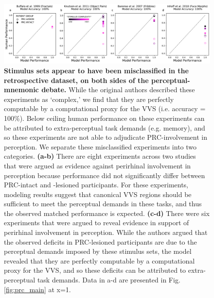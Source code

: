 \documentclass[11pt]{article}
\begin{document}
\begin{figure}[ht]
\centering
\renewcommand{\figurename}{Supplementary Figure}
\includegraphics[width=\linewidth]{figures/S2}
\caption{\textbf{Stimulus sets appear to have been misclassified in the retrospective dataset, on both sides of the perceptual-mnemonic debate.} While the original authors described these experiments as `complex,' we find that they are perfectly computable by a computational proxy for the VVS (i.e. accuracy = 100\%). Below ceiling human performance on these experiments can be attributed to extra-perceptual task demands (e.g. memory), and so these experiments are not able to adjudicate PRC-involvement in perception. We separate these misclassified experiments into two categories. \textbf{(a-b)} There are eight experiments across two studies that were argued as evidence against perirhinal involvement in perception because performance did not significantly differ between PRC-intact and -lesioned participants. For these experiments, modeling results suggest that canonical VVS regions should be sufficient to meet the perceptual demands in these tasks, and thus the observed matched performance is expected. \textbf{(c-d)} There were six experiments that were argued to reveal evidence in support of perirhinal involvement in perception. While the authors argued that the observed deficits in PRC-lesioned participants are due to the perceptual demands imposed by these stimulus sets, the model revealed that they are perfectly computable by a computational proxy for the VVS, and so these deficits can be attributed to extra-perceptual task demands. Data in a-d are presented in Fig. \ref{fig:prc_main} at x=1.}
\label{fig:misclassified}
\end{figure}
\end{document}
